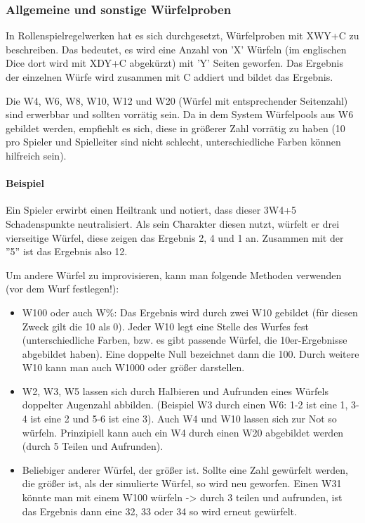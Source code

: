 \documentclass{article}
\begin{document}
\subsubsection{Allgemeine und sonstige Würfelproben}

In Rollenspielregelwerken hat es sich durchgesetzt, Würfelproben mit XWY+C zu beschreiben. Das bedeutet, es wird eine
Anzahl von 'X' Würfeln (im englischen Dice dort wird mit XDY+C abgekürzt) mit 'Y' Seiten geworfen. Das Ergebnis der
einzelnen Würfe wird zusammen mit C addiert und bildet das Ergebnis.

Die W4, W6, W8, W10, W12 und W20 (Würfel mit entsprechender Seitenzahl) sind erwerbbar und sollten vorrätig sein.
Da in dem System Würfelpools aus W6 gebildet werden, empfiehlt es sich, diese in größerer Zahl vorrätig zu haben
(10 pro Spieler und Spielleiter sind nicht schlecht, unterschiedliche Farben können hilfreich sein).

\paragraph{Beispiel}

Ein Spieler erwirbt einen Heiltrank und notiert, dass dieser 3W4+5 Schadenspunkte neutralisiert. Als sein Charakter
diesen nutzt, würfelt er drei vierseitige Würfel, diese zeigen das Ergebnis 2, 4 und 1 an. Zusammen mit der ''5'' ist
das Ergebnis also 12.

Um andere Würfel zu improvisieren, kann man folgende Methoden verwenden (vor dem Wurf festlegen!):

\begin{itemize}
\item W100 oder auch W\%: Das Ergebnis wird durch zwei W10 gebildet (für diesen Zweck gilt die 10 als 0). Jeder W10 legt eine Stelle des Wurfes fest (unterschiedliche Farben, bzw. es gibt passende Würfel, die 10er-Ergebnisse abgebildet haben). Eine doppelte Null bezeichnet dann die 100. Durch weitere W10 kann man auch W1000 oder größer darstellen.
\item W2, W3, W5 lassen sich durch Halbieren und Aufrunden eines Würfels doppelter Augenzahl abbilden. (Beispiel W3 durch einen W6: 1-2 ist eine 1, 3-4 ist eine 2 und 5-6 ist eine 3). Auch W4 und W10 lassen sich zur Not so würfeln. Prinzipiell kann auch ein W4 durch einen W20 abgebildet werden (durch 5 Teilen und Aufrunden).
\item Beliebiger anderer Würfel, der größer ist. Sollte eine Zahl gewürfelt werden, die größer ist, als der simulierte Würfel, so wird neu geworfen. Einen W31 könnte man mit einem W100 würfeln -> durch 3 teilen und aufrunden, ist das Ergebnis dann eine 32, 33 oder 34 so wird erneut gewürfelt.
\end{itemize}
\end{document}
